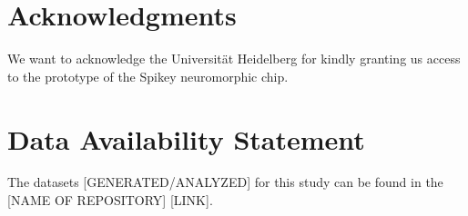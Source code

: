\documentclass[utf8]{frontiersFPHY} %
\begin{document}
\section*{Acknowledgments}
We want to acknowledge the Universit\"at Heidelberg for kindly granting us access to the prototype of the Spikey neuromorphic chip.


\section*{Data Availability Statement}
The datasets [GENERATED/ANALYZED] for this study can be found in the [NAME OF REPOSITORY] [LINK].



\end{document}
